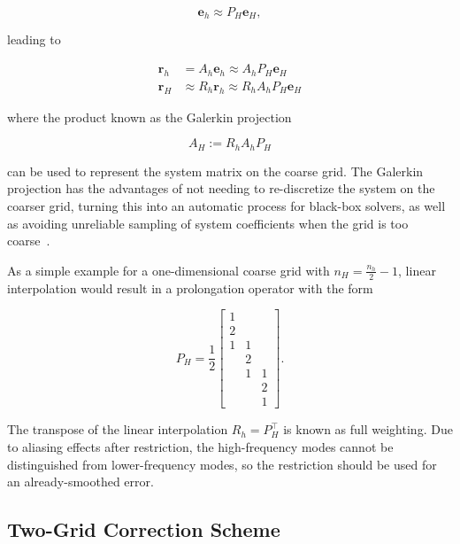 \begin{equation}
	\mathbf{e}_h \approx P_H \mathbf{e}_H,
\end{equation}

leading to

\begin{equation}
	\begin{aligned}
	\mathbf{r}_h & = A_h \mathbf{e}_h \approx A_h P_H \mathbf{e}_H \\
	\mathbf{r}_H & \approx R_h \mathbf{r}_h \approx R_h A_h P_H \mathbf{e}_H
	\end{aligned}
\end{equation}

where the product known as the Galerkin projection

\begin{equation}
	\label{eq:Galerkin}
	A_H := R_h A_h P_H
\end{equation}

can be used to represent the system matrix on the coarse grid. The Galerkin projection has the advantages of not needing to re-discretize the system on the coarser grid, turning this into an automatic process for black-box solvers, as well as avoiding unreliable sampling of system coefficients when the grid is too coarse~\cite{Wesseling2004}.

As a simple example for a one-dimensional coarse grid with $n_H = \frac{n_h}{2} - 1$, linear interpolation would result in a prolongation operator with the form

\begin{equation}
	P_H = \frac{1}{2}\begin{bmatrix}
		1 &   &   \\
		2 &   &   \\
		1 & 1 &   \\
		  & 2 &   \\
		  & 1 & 1 \\
		  &   & 2 \\
		  &   & 1
	\end{bmatrix}.
\end{equation}

The transpose of the linear interpolation $R_h = P_H^\top$ is known as full weighting. Due to aliasing effects after restriction, the high-frequency modes cannot be distinguished from lower-frequency modes, so the restriction should be used for an already-smoothed error.

\subsection{Two-Grid Correction Scheme}

